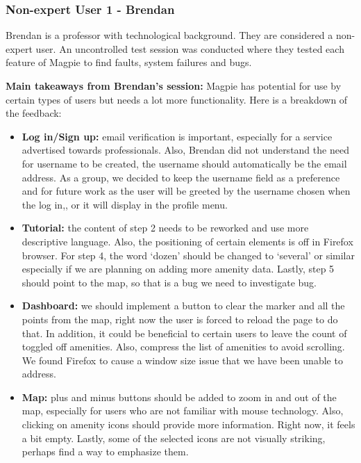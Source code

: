 \subsubsection{Non-expert User 1 - Brendan}
Brendan is a professor with technological background. They are considered a
non-expert user. An uncontrolled test session was conducted where they tested
each feature of Magpie to find faults, system failures and bugs.

\textbf{Main takeaways from Brendan's session: }Magpie has potential for use by
certain types of users but needs a lot more functionality. Here is a breakdown
of the feedback:
\begin{itemize}
  \item \textbf{Log in/Sign up: } email verification is important, especially
        for a service advertised towards professionals. Also, Brendan did not
        understand the need for username to be created, the username should
        automatically be the email address. As a group, we decided to keep the
        username field as a preference and for future work as the user will be
        greeted by the username chosen when the log in,, or it will display in the
        profile menu.
        \vspace{0.2cm}
        
  \item \textbf{Tutorial: }the content of step 2 needs to be reworked and use
        more descriptive language. Also, the positioning of certain elements is off
        in Firefox browser. For step 4, the word `dozen' should be changed to
        `several' or similar especially if we are planning on adding more amenity
        data. Lastly, step 5 should point to the map, so that is a bug we need to
        investigate bug.
        \vspace{0.2cm}
        
  \item \textbf{Dashboard: }we should implement a button to clear the marker
        and all the points from the map, right now the user is forced to reload the
        page to do that. In addition, it could be beneficial to certain users to
        leave the count of toggled off amenities. Also, compress the list of
        amenities to avoid scrolling. We found Firefox to cause a window size
        issue that we have been unable to address.
        \vspace{0.2cm}
        
  \item \textbf{Map: } plus and minus buttons should be added to zoom in and
        out of the map, especially for users who are not familiar with mouse
        technology. Also, clicking on amenity icons should provide more information.
        Right now, it feels a bit empty. Lastly, some of the selected icons are not
        visually striking, perhaps find a way to emphasize them.
        \vspace{0.2cm}
        

\end{itemize}
